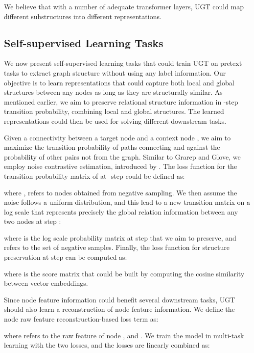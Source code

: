 \documentclass[oneside]{article}
\begin{document}
We believe that with a number of adequate transformer layers, UGT could map different substructures into different representations.





\subsection{Self-supervised Learning Tasks}






We now present self-supervised learning tasks that could train UGT on pretext tasks to extract graph structure without using any label information.
Our objective is to learn representations that could capture both local and global 
structures between any nodes as long as they are structurally similar.
As mentioned earlier, we aim to preserve relational structure information in -step transition probability, combining local and global structures.
The learned representations could then be used for solving different downstream tasks.

Given a connectivity between a target node  and a context node , we aim to maximize the transition probability of paths connecting  and  against the probability of other pairs not from the graph. 
Similar to Grarep and Glove, we employ noise contrastive estimation, introduced by \cite{GutmannH12}.
The loss function for the transition probability matrix of  at -step could be defined as:

where  ,  refers to nodes obtained from negative sampling.
We then assume the noise follows a uniform distribution, and this lead to a new transition matrix on a log scale that represents precisely the global relation information between any two nodes at step :

where  is the log scale probability matrix at step  that we aim to preserve, and  refers to the set of negative samples.
Finally, the loss function for structure preservation at step  can be computed as:

where  is the score matrix that could be built by computing the cosine similarity between vector embeddings.

Since node feature information could benefit several downstream tasks, UGT should also learn a reconstruction of node feature information.
We define the node raw feature reconstruction-based loss term as:

where  refers to the raw feature of node , and .
We train the model in multi-task learning with the two losses, and the losses are linearly combined as:
\end{document}
